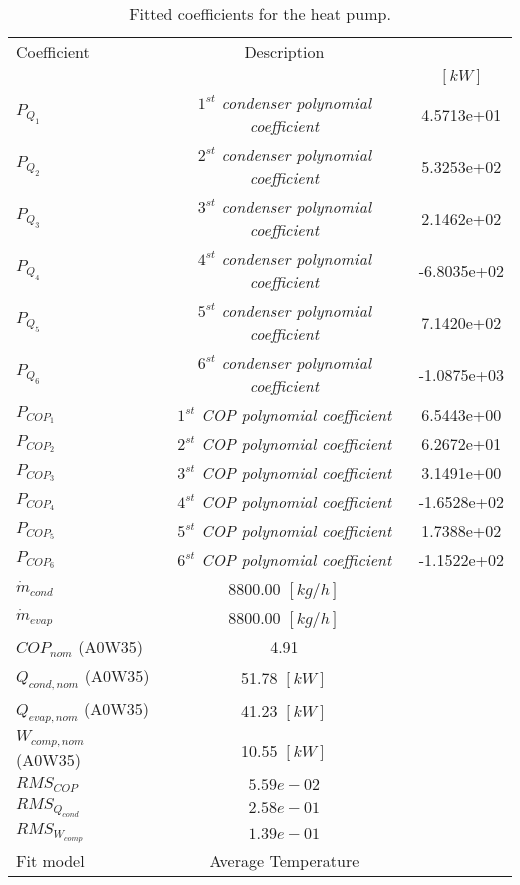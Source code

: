 \documentclass[english]{SPFShortReport}
\author{Dani Carbonell}
\begin{document}
\begin{table}[!ht]
\begin{small}
\caption{Fitted coefficients for the heat pump.}
\begin{center}
\resizebox{12cm}{!} 
{
\begin{tabular}{l | c c } 
\hline
\hline
Coefficient &Description & \\ 
 & &$[kW]$\\ 
\hline
$P_{Q_{1}}$ & \emph{$1^{st}$ condenser polynomial coefficient}  & 4.5713e+01    \\ 
$P_{Q_{2}}$ & \emph{$2^{st}$ condenser polynomial coefficient}  & 5.3253e+02    \\ 
$P_{Q_{3}}$ & \emph{$3^{st}$ condenser polynomial coefficient}  & 2.1462e+02    \\ 
$P_{Q_{4}}$ & \emph{$4^{st}$ condenser polynomial coefficient}  & -6.8035e+02    \\ 
$P_{Q_{5}}$ & \emph{$5^{st}$ condenser polynomial coefficient}  & 7.1420e+02    \\ 
$P_{Q_{6}}$ & \emph{$6^{st}$ condenser polynomial coefficient}  & -1.0875e+03    \\ 
\hline
$P_{COP_{1}}$ & \emph{$1^{st}$ COP polynomial coefficient}  & 6.5443e+00    \\ 
$P_{COP_{2}}$ & \emph{$2^{st}$ COP polynomial coefficient}  & 6.2672e+01    \\ 
$P_{COP_{3}}$ & \emph{$3^{st}$ COP polynomial coefficient}  & 3.1491e+00    \\ 
$P_{COP_{4}}$ & \emph{$4^{st}$ COP polynomial coefficient}  & -1.6528e+02    \\ 
$P_{COP_{5}}$ & \emph{$5^{st}$ COP polynomial coefficient}  & 1.7388e+02    \\ 
$P_{COP_{6}}$ & \emph{$6^{st}$ COP polynomial coefficient}  & -1.1522e+02    \\ 
\hline
$\dot m_{cond}$ & 8800.00 $[kg/h]$ \\ 
$\dot m_{evap}$ & 8800.00 $[kg/h]$ \\ 
\hline
$COP_{nom}$ (A0W35)& 4.91 \\ 
$Q_{cond,nom}$ (A0W35)& 51.78 $[kW]$\\ 
$Q_{evap,nom}$ (A0W35)& 41.23 $[kW]$\\ 
$W_{comp,nom}$ (A0W35)& 10.55 $[kW]$\\ 
\hline
 $RMS_{COP}$ & $5.59e-02$ \\ 
 $RMS_{Q_{cond}}$ & $2.58e-01$ \\ 
 $RMS_{W_{comp}}$ & $1.39e-01$ \\ 
\hline
Fit model & Average Temperature\\ 
\hline
\hline
\end{tabular}
}
\label{CoefTable}
\end{center}
\end{small}
\end{table}
\end{document}

